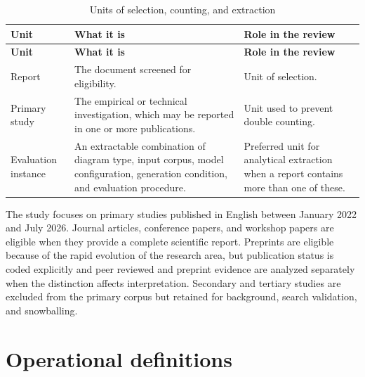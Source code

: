 \begin{longtable}{p{} p{} p{}}
\caption{Units of selection, counting, and extraction}
\label{tab:protocol_units}\\
\toprule
\textbf{Unit} & \textbf{What it is} & \textbf{Role in the review} \\
\midrule
\endfirsthead
\toprule
\textbf{Unit} & \textbf{What it is} & \textbf{Role in the review} \\
\midrule
\endhead
Report & The document screened for eligibility. & Unit of selection. \\
Primary study & The empirical or technical investigation, which may be reported in one or more publications. & Unit used to prevent double counting. \\
Evaluation instance & An extractable combination of diagram type, input corpus, model configuration, generation condition, and evaluation procedure. & Preferred unit for analytical extraction when a report contains more than one of these. \\
\bottomrule
\end{longtable}

The study focuses on primary studies published in English between January 2022 and July 2026. Journal articles, conference papers, and workshop papers are eligible when they provide a complete scientific report. Preprints are eligible because of the rapid evolution of the research area, but publication status is coded explicitly and peer reviewed and preprint evidence are analyzed separately when the distinction affects interpretation. Secondary and tertiary studies are excluded from the primary corpus but retained for background, search validation, and snowballing.

\section{Operational definitions}
\label{sec:protocol_definitions}

